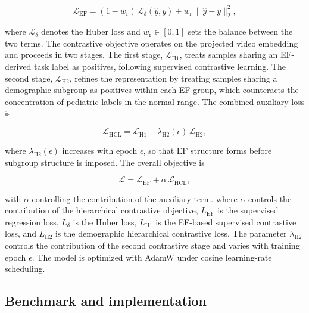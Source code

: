 \documentclass{ws-procs11x85}
\begin{document}
\begin{equation}
\mathcal{L}_{\mathrm{EF}} = (1-w_{\mathrm{r}})\,\mathcal{L}_{\delta}(\hat{y},y) + w_{\mathrm{r}}\,\lVert \hat{y}-y \rVert_2^2,
\end{equation}

where $\mathcal{L}_{\delta}$ denotes the Huber loss and $w_{\mathrm{r}}\in[0,1]$ sets the balance between the two terms.
The contrastive objective operates on the projected video embedding and proceeds in two stages.
The first stage, $\mathcal{L}_{\mathrm{H1}}$, treats samples sharing an EF-derived task label as positives, following supervised contrastive learning.\cite{khosla2020supcon}
The second stage, $\mathcal{L}_{\mathrm{H2}}$, refines the representation by treating samples sharing a demographic subgroup as positives within each EF group, which counteracts the concentration of pediatric labels in the normal range.\cite{reddy2023echonetpeds}
The combined auxiliary loss is

\begin{equation}
\mathcal{L}_{\mathrm{HCL}} = \mathcal{L}_{\mathrm{H1}} + \lambda_{\mathrm{H2}}(\epsilon)\,\mathcal{L}_{\mathrm{H2}},
\end{equation}

where $\lambda_{\mathrm{H2}}(\epsilon)$ increases with epoch $\epsilon$, so that EF structure forms before subgroup structure is imposed.
The overall objective is

\begin{equation}
\mathcal{L} = \mathcal{L}_{\mathrm{EF}} + \alpha\,\mathcal{L}_{\mathrm{HCL}},
\end{equation}

{\color{blue}with $\alpha$ controlling the contribution of the auxiliary term.} {\color{red}where $\alpha$ controls the contribution of the hierarchical contrastive
objective, $L_{\mathrm{EF}}$ is the supervised regression loss,
$L_{\delta}$ is the Huber loss, $L_{\mathrm{H1}}$ is the EF-based
supervised contrastive loss, and $L_{\mathrm{H2}}$ is the demographic
hierarchical contrastive loss. The parameter $\lambda_{\mathrm{H2}}$
controls the contribution of the second contrastive stage and varies with
training epoch $\epsilon$.} The model is optimized with AdamW under cosine learning-rate scheduling.

\subsection{Benchmark and implementation}
\end{document}
